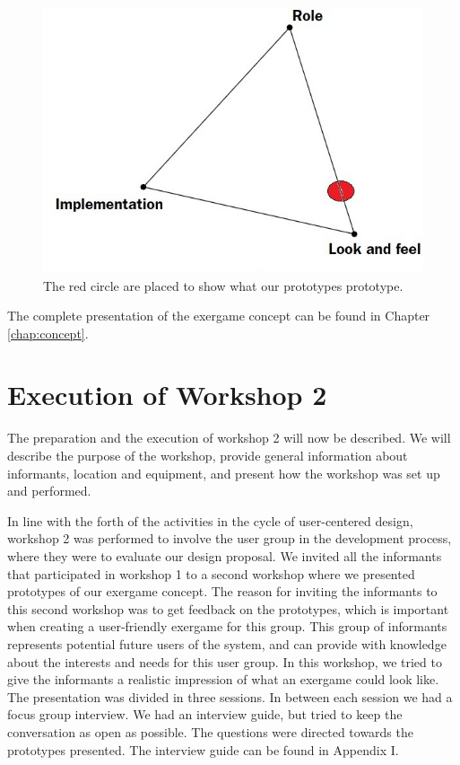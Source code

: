 \begin{figure} [H]
\centering
\includegraphics[scale=0.4]{prototypemodelDobbel}
\caption[Prototype model placing our prototype]{The red circle are placed to show what our prototypes prototype.}
\label{fig:prototype2}
\end{figure}

The complete presentation of the exergame concept can be found in Chapter \ref{chap:concept}.
 
\section{Execution of Workshop 2}
\label{sec:ws2}
The preparation and the execution of workshop 2 will now be described. We will describe the purpose of the workshop, provide general information about informants, location and equipment, and present how the workshop was set up and performed. 

In line with the forth of the activities in the cycle of user-centered design, workshop 2 was performed to involve the user group in the development process, where they were to evaluate our design proposal. We invited all the informants that participated in workshop 1 to a second workshop where we presented prototypes of our exergame concept. The reason for inviting the informants to this second workshop was to get feedback on the prototypes, which is important when creating a user-friendly exergame for this group. This group of informants represents potential future users of the system, and can provide with knowledge about the interests and needs for this user group. In this workshop, we tried to give the informants a realistic impression of what an exergame could look like. The presentation was divided in three sessions. In between each session we had a focus group interview. We had an interview guide, but tried to keep the conversation as open as possible. The questions were directed towards the prototypes presented. The interview guide can be found in Appendix I.

